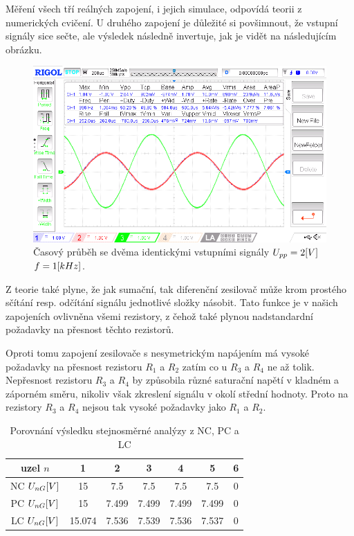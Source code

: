 \documentclass{article}
\begin{document}
Měření všech tří reálných zapojení, i jejich simulace, odpovídá teorii z numerických cvičení.
U druhého zapojení je důležité si povšimnout, že vstupní signály sice sečte, ale výsledek následně invertuje, jak je vidět na následujícím obrázku.
\begin{figure}[H]
  \begin{minipage}[t]{\textwidth}
    \centering
    \includegraphics[width=\textwidth]{LAB/NewFile7.png}
    Časový průběh se dvěma identickými vstupními signály \(U_{pp} = 2\-[V]\) \(f = 1\-[kHz]\).
  \end{minipage}
\end{figure}

Z teorie také plyne, že jak sumační, tak diferenční zesilovač může krom prostého sčítání resp. odčítání signálu jednotlivé složky násobit.
Tato funkce je v našich zapojeních ovlivněna všemi rezistory, z čehož také plynou nadstandardní požadavky na přesnost těchto rezistorů.

Oproti tomu zapojení zesilovače s nesymetrickým napájením má vysoké požadavky na přesnost rezistoru \(R_1\) a \(R_2\) zatím co u \(R_3\) a \(R_4\) ne až tolik.
Nepřesnost rezistoru \(R_3\) a \(R_4\) by způsobila různé saturační napětí v kladném a záporném směru, nikoliv však zkreslení signálu v okolí střední hodnoty.
Proto na rezistory \(R_3\) a \(R_4\) nejsou tak vysoké požadavky jako \(R_1\) a \(R_2\).

\begin{table}[H]
  \centering
  \begin{tabular}{|c|c|c|c|c|c|c|} 
    \hline
    uzel \(n\)          & 1       & 2      & 3     & 4     & 5       & 6      \\ \hline
    NC \(U_{nG}\-[V]\)  & 15      & 7.5    & 7.5   & 7.5   & 7.5     & 0      \\ \hline
    PC \(U_{nG}\-[V]\)  & 15      & 7.499  & 7.499 & 7.499 & 7.499   & 0      \\ \hline
    LC \(U_{nG}\-[V]\)  & 15.074  & 7.536  & 7.539 & 7.536 & 7.537   & 0      \\ \hline

  \end{tabular}
  \normalsize
  \caption{Porovnání výsledku stejnosměrné analýzy z NC, PC a LC}
\end{table}
\end{document}
